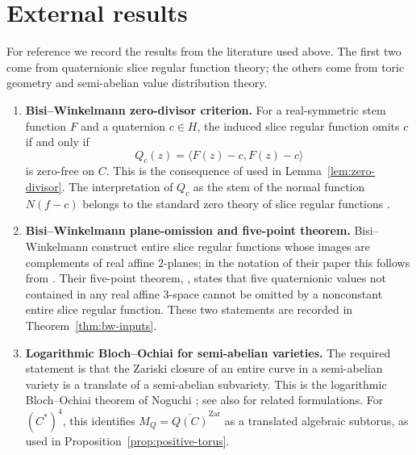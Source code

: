 \documentclass[11pt]{amsart}
\def\HH{H}%
\def\CC{C}%
\numberwithin{equation}{section}
\theoremstyle{definition}
\theoremstyle{remark}
\newcommand{\HH}{\mathbb H}
\newcommand{\CC}{\mathbb C}
\newcommand{\Zar}{\mathrm{Zar}}
\begin{document}
\section{External results}
\label{app:external-inputs}

For reference we record the results from the literature used above.  The first two come from quaternionic slice regular function theory; the others come from toric geometry and semi-abelian value distribution theory.

\begin{enumerate}[label=\textup{(E\arabic*)}]
\item \textbf{Bisi--Winkelmann zero-divisor criterion.}
For a real-symmetric stem function $F$ and a quaternion $c\in\HH$, the induced slice regular function omits $c$ if and only if
\[
Q_c(z)=\langle F(z)-c,F(z)-c\rangle
\]
is zero-free on $\CC$.  This is the consequence of \cite[Proposition~2.2]{BisiWinkelmann2020QuaternionicPicard} used in Lemma~\ref{lem:zero-divisor}.  The interpretation of $Q_c$ as the stem of the normal function $N(f-c)$ belongs to the standard zero theory of slice regular functions \cite{GentiliStoppato2008Zeros,GentiliStoppatoStruppa2013Regular}.

\item \textbf{Bisi--Winkelmann plane-omission and five-point theorem.}
Bisi--Winkelmann construct entire slice regular functions whose images are complements of real affine $2$-planes; in the notation of their paper this follows from \cite[Proposition~5.1, Proposition~6.1 and the subsequent remark]{BisiWinkelmann2020QuaternionicPicard}.  Their five-point theorem, \cite[Theorem~3.5]{BisiWinkelmann2020QuaternionicPicard}, states that five quaternionic values not contained in any real affine $3$-space cannot be omitted by a nonconstant entire slice regular function.  These two statements are recorded in Theorem~\ref{thm:bw-inputs}.

\item \textbf{Logarithmic Bloch--Ochiai for semi-abelian varieties.}
The required statement is that the Zariski closure of an entire curve in a semi-abelian variety is a translate of a semi-abelian subvariety.  This is the logarithmic Bloch--Ochiai theorem of Noguchi \cite[Main Theorem~(i)]{Noguchi1998HolomorphicCurves}; see also \cite{NoguchiWinkelmannYamanoi2002SMT,DethloffLu2001LogarithmicJetBundles} for related formulations.  For $(\CC^*)^4$, this identifies $M_Q=\overline{Q(\CC)}^{\Zar}$ as a translated algebraic subtorus, as used in Proposition~\ref{prop:positive-torus}.


\end{enumerate}
\end{document}
